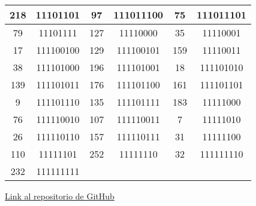 \documentclass[conference,onecolumn,12pt]{IEEEtran}
\numberwithin{equation}{subsection}
\begin{document}
\begin{table}[h]
\begin{tabular}{cccccc}
218 & 11101101 & 97 & 111011100 & 75 & 111011101 \\ \hline
79 & 11101111 & 127 & 11110000 & 35 & 11110001 \\ \hline
17 & 111100100 & 129 & 111100101 & 159 & 11110011 \\ \hline
38 & 111101000 & 196 & 111101001 & 18 & 111101010 \\ \hline
139 & 111101011 & 176 & 111101100 & 161 & 111101101 \\ \hline
9 & 111101110 & 135 & 111101111 & 183 & 11111000 \\ \hline
76 & 111110010 & 107 & 111110011 & 7 & 11111010 \\ \hline
26 & 111110110 & 157 & 111110111 & 31 & 11111100 \\ \hline
110 & 11111101 & 252 & 11111110 & 32 & 111111110 \\ \hline
232 & 111111111 &  &  &  &  \\ \hline
\end{tabular}
\end{table}







\href{https://github.com/NagelMS/Tarea2_CE2.git}{Link al repositorio de GitHub}
\end{document}
